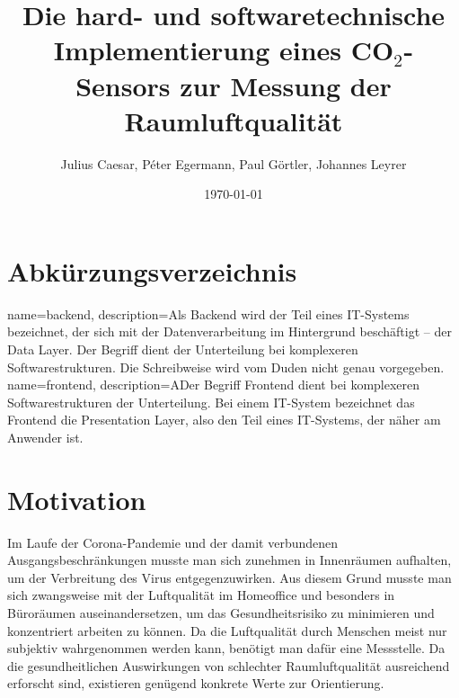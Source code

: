 \documentclass[a4paper,
    11pt,
    headings=small,
    ngerman,
    listof=totoc,
    numbers=noenddot]{scrreprt}[2021/11/13]
\title{Die hard- und softwaretechnische Implementierung eines CO$_2$-Sensors zur Messung der Raumluftqualität}
\author{Julius Caesar, Péter Egermann, Paul Görtler, Johannes Leyrer}
\date{\today}
\begin{document}
\maketitle

\newpage

\tableofcontents

\newpage

\chapter*{Abkürzungsverzeichnis}

\begin{acronym}[DGUV]
\end{acronym}

{
  name=backend,
  description={Als Backend wird der Teil eines IT-Systems bezeichnet, der sich mit der Datenverarbeitung im Hintergrund beschäftigt – der Data Layer. Der Begriff dient der Unterteilung bei komplexeren Softwarestrukturen. Die Schreibweise wird vom Duden nicht genau vorgegeben. \autocite{backend_definition}}
}
{
  name=frontend,
  description={ADer Begriff Frontend dient bei komplexeren Softwarestrukturen der Unterteilung. Bei einem IT-System bezeichnet das Frontend die Presentation Layer, also den Teil eines IT-Systems, der näher am Anwender ist. \autocite{frontend_definition}}
}

\newpage


\chapter{Motivation}

Im Laufe der Corona-Pandemie und der damit verbundenen Ausgangsbeschränkungen musste man sich zunehmen in Innenräumen aufhalten, um der Verbreitung des Virus entgegenzuwirken. Aus diesem Grund musste man sich zwangsweise mit der Luftqualität im Homeoffice und besonders in Büroräumen auseinandersetzen, um das Gesundheitsrisiko zu minimieren und konzentriert arbeiten zu können. Da die Luftqualität durch Menschen meist nur subjektiv wahrgenommen werden kann, benötigt man dafür eine Messstelle. Da die gesundheitlichen Auswirkungen von schlechter Raumluftqualität ausreichend erforscht sind, existieren genügend konkrete Werte zur Orientierung.
\end{document}
